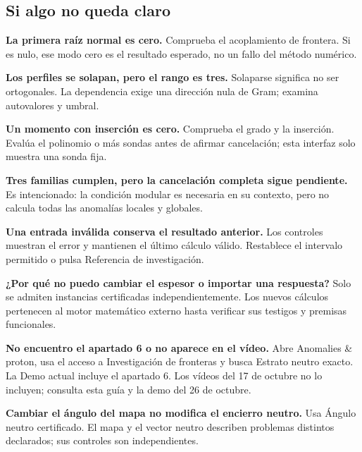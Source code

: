 \documentclass[11pt,a4paper]{article}
\begin{document}
\subsection*{Si algo no queda claro}
\textbf{La primera raíz normal es cero.} Comprueba el acoplamiento de frontera. Si es nulo, ese modo cero es el resultado esperado, no un fallo del método numérico.

\textbf{Los perfiles se solapan, pero el rango es tres.} Solaparse significa no ser ortogonales. La dependencia exige una dirección nula de Gram; examina autovalores y umbral.

\textbf{Un momento con inserción es cero.} Comprueba el grado y la inserción. Evalúa el polinomio o más sondas antes de afirmar cancelación; esta interfaz solo muestra una sonda fija.

\textbf{Tres familias cumplen, pero la cancelación completa sigue pendiente.} Es intencionado: la condición modular es necesaria en su contexto, pero no calcula todas las anomalías locales y globales.

\textbf{Una entrada inválida conserva el resultado anterior.} Los controles muestran el error y mantienen el último cálculo válido. Restablece el intervalo permitido o pulsa Referencia de investigación.

\textbf{¿Por qué no puedo cambiar el espesor o importar una respuesta?} Solo se admiten instancias certificadas independientemente. Los nuevos cálculos pertenecen al motor matemático externo hasta verificar sus testigos y premisas funcionales.

\textbf{No encuentro el apartado 6 o no aparece en el vídeo.} Abre Anomalies \& proton, usa el acceso a Investigación de fronteras y busca Estrato neutro exacto. La Demo actual incluye el apartado 6. Los vídeos del 17 de octubre no lo incluyen; consulta esta guía y la demo del 26 de octubre.

\textbf{Cambiar el ángulo del mapa no modifica el encierro neutro.} Usa Ángulo neutro certificado. El mapa y el vector neutro describen problemas distintos declarados; sus controles son independientes.
\end{document}

